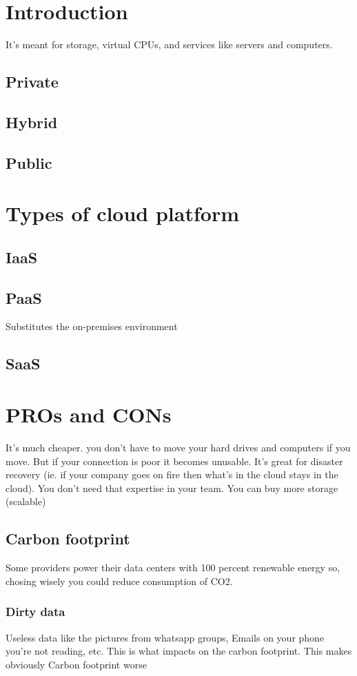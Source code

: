 \documentclass[a4paper,12pt]{book}
\begin{document}
\section{Introduction}
It's meant for storage, virtual CPUs, and services like servers and computers. 
\subsection{Private}
\subsection{Hybrid}
\subsection{Public}

\section{Types of cloud platform}
\subsection{IaaS}
\subsection{PaaS}
Substitutes the on-premises environment
\subsection{SaaS}


\section{PROs and CONs}
It's much cheaper. you don't have to move your hard drives and computers if you move. But if your connection is poor it becomes unusable. It's great for disaster recovery (ie. if your company goes on fire then what's in the cloud stays in the cloud). You don't need that expertise in your team. You can buy more storage (scalable)

\subsection{Carbon footprint}
 Some providers power their data centers with 100 percent renewable energy so, chosing wisely you could reduce consumption of CO2. 

\subsubsection{Dirty data}
Useless data like the pictures from whatsapp groups, Emails on your phone you're not reading, etc. This is what impacts on the carbon footprint. This makes obviously Carbon footprint worse
\end{document}
